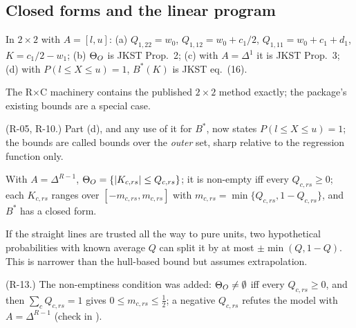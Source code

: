 \subsection{Closed forms and the linear program}

\begin{result}\label{res:p2a-p4}
 In $2\times2$ with $A=[l,u]$: (a) $Q_{1,22}=w_0$,
$Q_{1,12}=w_0+c_1/2$, $Q_{1,11}=w_0+c_1+d_1$, $K=c_1/2-w_1$; (b) $\Theta_O$ is JKST
Prop.~2; (c) with $A=\Delta^1$ it is JKST Prop.~3; (d) with $P(l\le X\le u)=1$,
$B^*(K)$ is JKST eq.~(16).
\end{result}
\begin{plain}
The R$\times$C machinery contains the published $2\times2$ method exactly; the
package's existing bounds are a special case.
\end{plain}
\begin{revnote}(R-05, R-10.) Part (d), and any use of it for $B^*$, now states $P(l\le X\le u)=1$; the bounds are called bounds over the \emph{outer} set, sharp relative to the regression function only.\end{revnote}

\begin{result}
 With $A=\Delta^{R-1}$, $\Theta_O=\{|K_{c,rs}|\le Q_{c,rs}\}$; it is
non-empty iff every $Q_{c,rs}\ge0$; each $K_{c,rs}$ ranges over
$[-m_{c,rs},m_{c,rs}]$ with $m_{c,rs}=\min\{Q_{c,rs},1-Q_{c,rs}\}$, and $B^*$
has a closed form.
\end{result}
\begin{plain}
If the straight lines are trusted all the way to pure units, two hypothetical
probabilities with known average $Q$ can split it by at most
$\pm\min(Q,1-Q)$. This is narrower than the hull-based bound but assumes
extrapolation.
\end{plain}
\begin{revnote}(R-13.) The non-emptiness condition was added: $\Theta_O\ne\emptyset$ iff every $Q_{c,rs}\ge0$, and then $\sum_cQ_{c,rs}=1$ gives $0\le m_{c,rs}\le\tfrac12$; a negative $Q_{c,rs}$ refutes the model with $A=\Delta^{R-1}$ (check in ).\end{revnote}

